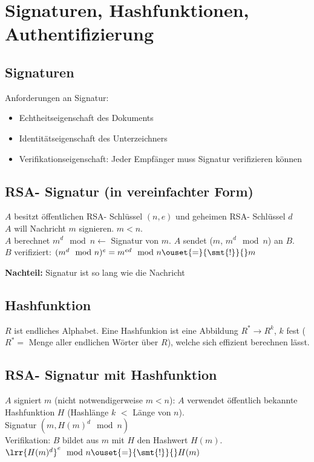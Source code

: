 \section{Signaturen, Hashfunktionen, Authentifizierung}
	\subsection{Signaturen}
		Anforderungen an Signatur:
			\begin{itemize}[-]
				\item Echtheitseigenschaft des Dokuments
				\item Identitätseigenschaft des Unterzeichners
				\item Verifikationseigenschaft: Jeder Empfänger muss Signatur verifizieren können
			\end{itemize}

	\subsection{RSA- Signatur (in vereinfachter Form)}
		$A$ besitzt öffentlichen RSA- Schlüssel $(n,e)$ und geheimen RSA- Schlüssel $d$\\
		$A$ will Nachricht $m$ signieren. $m<n$.\\
		$A$ berechnet $m^d\mod n\longleftarrow$ Signatur von $m$. $A$ sendet ($m$, $m^d\mod n$) an $B$.\\
		$B$ verifiziert: $(m^d\mod n)^e=m^{ed}\mod n\ouset{=}{\smt{!}}{}m$

		\textbf{Nachteil:} Signatur ist so lang wie die Nachricht

	\subsection{Hashfunktion}
		$R$ ist endliches Alphabet. Eine Hashfunkion ist eine Abbildung $R^*\rightarrow R^k$, $k$ fest ($R^*=$ Menge aller endlichen Wörter über $R$), welche sich effizient berechnen lässt.

	\subsection{RSA- Signatur mit Hashfunktion}
		$A$ signiert $m$ (nicht notwendigerweise $m<n$): $A$ verwendet öffentlich bekannte Hashfunktion $H$ (Hashlänge $k$ $<$ Länge von $n$).\\
		Signatur $(m,H(m)^d\mod n)$\\
		Verifikation: $B$ bildet aus $m$ mit $H$ den Hashwert $H(m)$. $\lrr{H(m)^d}^e\mod n\ouset{=}{\smt{!}}{}H(m)$

